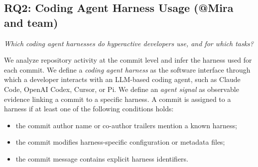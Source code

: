 \subsection*{RQ2: Coding Agent Harness Usage (@Mira and team)}
\emph{Which coding agent harnesses do hyperactive developers use, and for which tasks?}






We analyze repository activity at the commit level and infer the harness used for each commit. We define a \emph{coding agent harness} as the software interface through which a developer interacts with an LLM-based coding agent, such as Claude Code, OpenAI Codex, Cursor, or Pi. We define an \emph{agent signal} as observable evidence linking a commit to a specific harness. A commit is assigned to a harness if at least one of the following conditions holds:

\begin{itemize}
\item the commit author name or co-author trailers mention a known harness;
\item the commit modifies harness-specific configuration or metadata files;
\item the commit message contains explicit harness identifiers.
\end{itemize}


